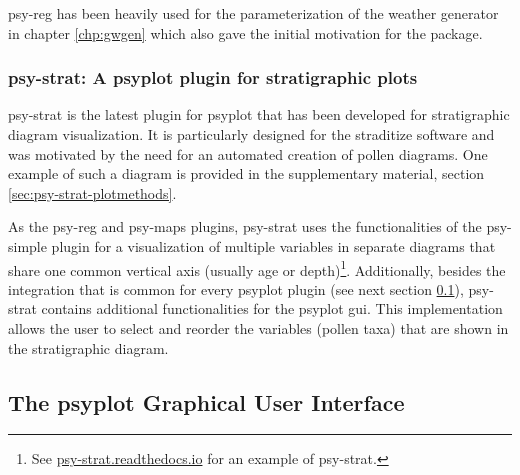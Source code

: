 \begin{refsection}
psy-reg has been heavily used for the parameterization of the weather generator in chapter \ref{chp:gwgen} which also gave the initial motivation for the package. 

\subsubsection{psy-strat: A psyplot plugin for stratigraphic plots}

psy-strat \citep{Sommer2019} is the latest plugin for psyplot that has been developed for stratigraphic diagram visualization. It is particularly designed for the straditize software \citep[chapter \ref{chp:straditize}]{SommerRechChevalierEtAl2019} and was motivated by the need for an automated creation of pollen diagrams. One example of such a diagram is provided in the supplementary material, section \ref{sec:psy-strat-plotmethods}.

As the psy-reg and psy-maps plugins, psy-strat uses the functionalities of the psy-simple plugin for a visualization of multiple variables in separate diagrams that share one common vertical axis (usually age or depth)\footnote{See \href{https://psy-strat.readthedocs.io}{psy-strat.readthedocs.io} for an example of psy-strat.}. Additionally, besides the integration that is common for every psyplot plugin (see next section \ref{sec:psyplot-gui}), psy-strat contains additional functionalities for the psyplot \gls{gui}. This implementation allows the user to select and reorder the variables (pollen taxa) that are shown in the stratigraphic diagram.


\subsection{The psyplot Graphical User Interface}  \label{sec:psyplot-gui}


\end{refsection}
